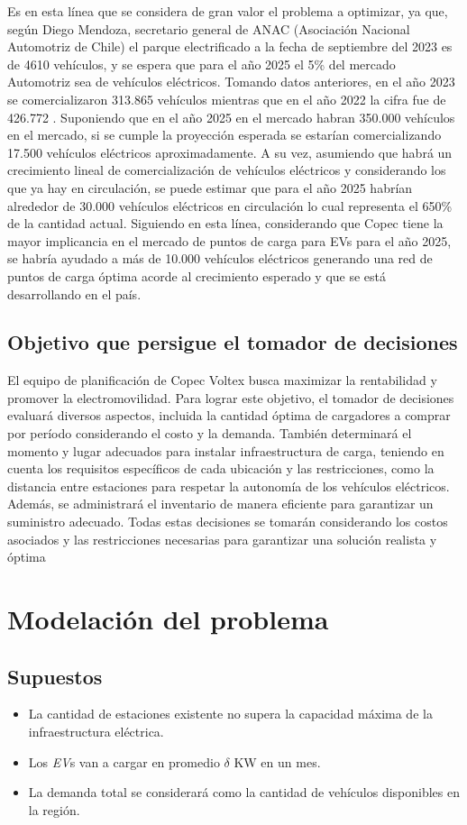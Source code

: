 \documentclass[letterpaper]{article}
\begin{document}
\begin{flushleft}
	Es en esta línea que se considera de gran valor el problema a optimizar, ya que, según Diego Mendoza, secretario general de ANAC (Asociación Nacional Automotriz de Chile) el parque electrificado a la fecha de septiembre del 2023 es de 4610 vehículos, y se espera que para el año 2025 el 5\% del mercado Automotriz sea de vehículos eléctricos. Tomando datos anteriores, en el año 2023 se comercializaron 313.865 vehículos \cite{chileautos} mientras que en el año 2022 la cifra fue de 426.772 \cite{Tercera-1}. Suponiendo que en el año 2025 en el mercado habran 350.000 vehículos en el mercado, si se cumple la proyección esperada se estarían comercializando 17.500 vehículos eléctricos aproximadamente. A su vez, asumiendo que habr\'a un crecimiento lineal de comercializaci\'on de veh\'iculos el\'ectricos y considerando los que ya hay en circulaci\'on, se puede estimar que para el año 2025 habr\'ian alrededor de 30.000 vehículos eléctricos en circulación lo cual representa el 650\% de la cantidad actual. Siguiendo en esta línea, considerando que Copec tiene la mayor implicancia en el mercado de puntos de carga para EVs para el año 2025, se habr\'ia ayudado a más de 10.000 vehículos eléctricos generando una red de puntos de carga óptima acorde al crecimiento esperado y que se está desarrollando en el país.
	\subsection{Objetivo que persigue el tomador de decisiones}
	El equipo de planificación de Copec Voltex busca maximizar la rentabilidad y promover la electromovilidad. Para lograr este objetivo, el tomador de decisiones evaluará diversos aspectos, incluida la cantidad óptima de cargadores a comprar por período considerando el costo y la demanda. También determinará el momento y lugar adecuados para instalar infraestructura de carga, teniendo en cuenta los requisitos específicos de cada ubicación y las restricciones, como la distancia entre estaciones para respetar la autonomía de los vehículos eléctricos. Además, se administrará el inventario de manera eficiente para garantizar un suministro adecuado. Todas estas decisiones se tomarán considerando los costos asociados y las restricciones necesarias para garantizar una solución realista y óptima

	\section{Modelación del problema}
	\subsection*{Supuestos}
	\begin{itemize}
		\item La cantidad de estaciones existente no supera la capacidad máxima de la infraestructura eléctrica.
		\item Los \textit{EV}s van a cargar en promedio $\delta$ KW en un mes.
		\item La demanda total se considerar\'a como la cantidad de veh\'iculos disponibles en la regi\'on.
	\end{itemize}

\end{flushleft}
\end{document}
